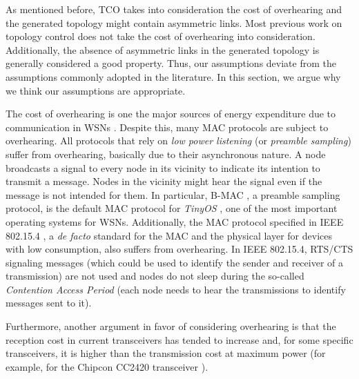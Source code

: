 \documentclass{llncs}
\begin{document}
As mentioned before, TCO takes into consideration the cost of overhearing and the generated topology might contain asymmetric links. Most previous work on topology
control does not take the cost of overhearing into consideration. Additionally, the absence of asymmetric links in the generated topology is generally considered a good property. Thus,
our assumptions deviate from the assumptions commonly adopted in the literature. In this section, we argue why we think our assumptions are appropriate.

The cost of overhearing is one the major sources of energy expenditure due to communication in WSNs \cite{Misra2010}. Despite this, many MAC protocols are subject to overhearing.
All protocols that rely on \emph{low power listening} (or \emph{preamble sampling}) \cite{Polastre2004,Hoiydi2004,Buettner2006,Zhang2009,Ansari2010} suffer from overhearing,
basically due to their asynchronous nature. A node broadcasts a signal to every node in its vicinity to indicate its intention to transmit a message. Nodes in the vicinity might hear the
signal even if the message is not intended for them.
In particular, \mbox{B-MAC} \cite{Polastre2004}, a preamble sampling protocol, is the default MAC protocol for \emph{TinyOS} \cite{Buettner2006}, 
one of the most important operating systems for WSNs. Additionally, the MAC protocol specified in IEEE 802.15.4 \cite{Society2006}, a \emph{de facto} standard for the MAC and the physical layer for devices with low consumption, also suffers from overhearing. In IEEE 802.15.4, RTS/CTS signaling messages (which could be used to identify the sender and receiver of a transmission) 
are not used and nodes do not sleep during the so-called \emph{Contention Access Period} (each node needs to hear the transmissions to identify messages sent to it).

Furthermore, another argument in favor of considering overhearing is that the reception cost in current transceivers has tended to increase \cite{CC2530,RF230} and, for some specific
transceivers, it is higher than the transmission cost at maximum power (for example, for the Chipcon CC2420 transceiver \cite{CC2420}).
\end{document}

